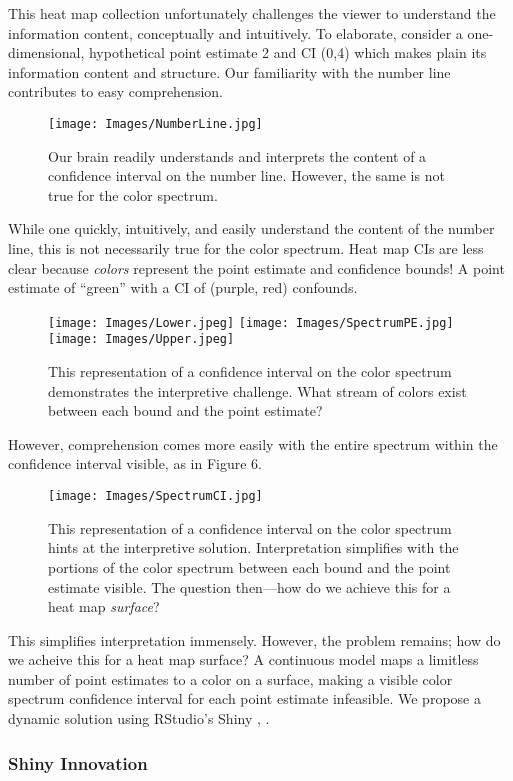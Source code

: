 \documentclass{article}
\begin{document}
This heat map collection unfortunately challenges the viewer to understand the information content, conceptually and intuitively. To elaborate, consider a one-dimensional, hypothetical point estimate 2 and CI (0,4) which makes plain its information content and structure. Our familiarity with the number line contributes to easy comprehension.
  \begin{figure}[H]
  \centering
	\texttt{[image: Images/NumberLine.jpg]} 
	\caption{Our brain readily understands and interprets the content of a confidence interval on the number line. However, the same is not true for the color spectrum.}
	\end{figure}
While one quickly, intuitively, and easily understand the content of the number line, this is not necessarily true for the color spectrum. Heat map CIs are less clear because {\it colors} represent the point estimate and confidence bounds! A point estimate of ``green'' with a CI of (purple, red) confounds.
  \begin{figure}[H]
  \centering
	\texttt{[image: Images/Lower.jpeg]} 
	\texttt{[image: Images/SpectrumPE.jpg]} 
	\texttt{[image: Images/Upper.jpeg]} 

	\caption{This representation of a confidence interval on the color spectrum demonstrates the interpretive challenge. What stream of colors exist between each bound and the point estimate?}
	\end{figure}
	
However, comprehension comes more easily with the entire spectrum within the confidence interval visible, as in Figure 6. 
  \begin{figure}[H]
  \centering
	\texttt{[image: Images/SpectrumCI.jpg]} 
	\caption{This representation of a confidence interval on the color spectrum hints at the interpretive solution. Interpretation simplifies with the portions of the color spectrum between each bound and the point estimate visible. The question then---how do we achieve this for a heat map {\it surface}?}
	\end{figure}
This simplifies interpretation immensely. However, the problem remains; how do we acheive this for a heat map surface? A continuous model maps a limitless number of point estimates to a color on a surface, making a visible color spectrum confidence interval for each point estimate infeasible. We propose a dynamic solution using RStudio's Shiny \citep{Shiny}, \citep{RStudio}.

\subsubsection{Shiny Innovation}
\end{document}
